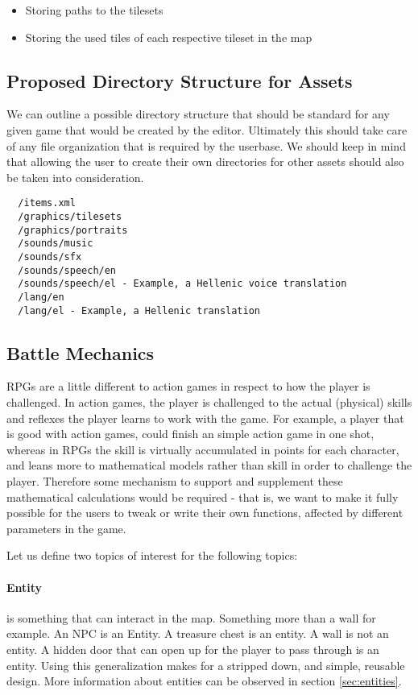 \begin{itemize} 
\item Storing paths to the tilesets
\item Storing the used tiles of each respective tileset in the map
\end{itemize} 

\subsection{Proposed Directory Structure for Assets}

We can outline a possible directory structure that should be standard for any
given game that would be created by the editor. Ultimately this should take
care of any file organization that is required by the userbase. We should keep
in mind that allowing the user to create their own directories for other assets
should also be taken into consideration.

\begin{lstlisting}
  /items.xml
  /graphics/tilesets
  /graphics/portraits
  /sounds/music
  /sounds/sfx
  /sounds/speech/en
  /sounds/speech/el - Example, a Hellenic voice translation
  /lang/en
  /lang/el - Example, a Hellenic translation
\end{lstlisting}

\subsection{Battle Mechanics}

RPGs are a little different to action games in respect to how the player is
challenged. In action games, the player is challenged to the actual (physical)
skills and reflexes the player learns to work with the game. For example, a
player that is good with action games, could finish an simple action game in
one shot, whereas in RPGs the skill is virtually accumulated in points for each
character, and leans more to mathematical models rather than skill in order to
challenge the player. Therefore some mechanism to support and supplement these
mathematical calculations would be required - that is, we want to make it fully
possible for the users to tweak or write their own functions, affected by 
different parameters in the game. 

Let us define two topics of interest for the following topics: 

\paragraph{Entity} is something that can interact in the map. Something more
than a wall for example. An NPC is an Entity. A treasure chest is an entity. A
wall is not an entity. A hidden door that can open up for the player to pass
through is an entity. Using this generalization makes for a stripped down,
and simple, reusable design. More information about entities can be observed in
section \ref{sec:entities}.

